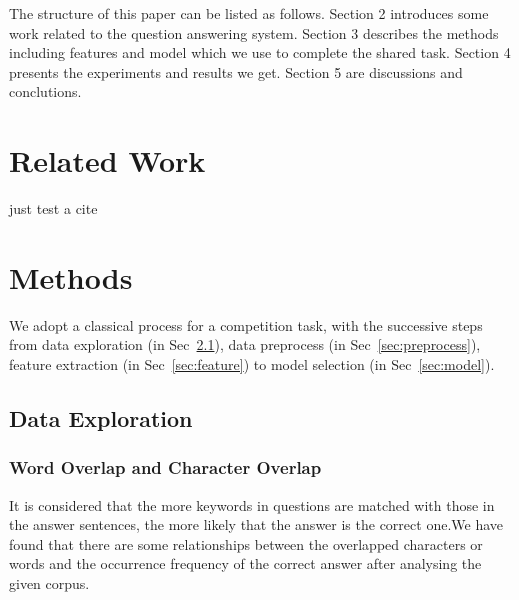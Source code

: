 \documentclass{llncs}
\begin{document}
The structure of this paper can be listed as follows. Section 2 introduces some work related to the question answering system. Section 3 describes the methods including features and model which we use to complete the shared task. Section 4  presents the experiments and results we get. Section 5 are discussions and conclutions.

\section{Related Work}
just test a cite~\cite{Severyn2015Learning}

\section{Methods}

We adopt a classical process for a competition task, with the successive steps from data exploration (in Sec~\ref{sec:exploration}), data preprocess (in Sec~\ref{sec:preprocess}), feature extraction (in Sec~\ref{sec:feature}) to model selection (in Sec~\ref{sec:model}).

\subsection{Data Exploration}
\label{sec:exploration}
\subsubsection{Word Overlap and Character Overlap}
It is considered that the more keywords in questions are matched with those in the answer sentences, the more likely that the answer is the correct one.We have found that there are some relationships between the overlapped characters or words and the occurrence frequency of the correct answer after analysing the given corpus.

\end{document}
